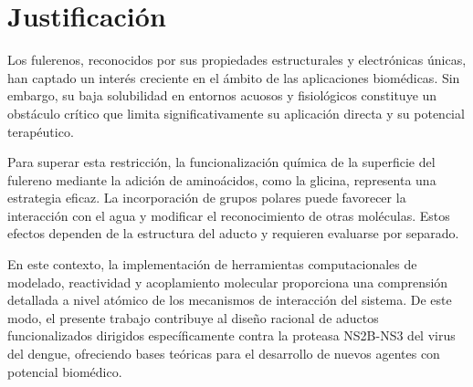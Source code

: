 \titleformat{\chapter}[display]
  {\normalfont\bfseries}{}{0pt}{\Large} %
\chapter{Justificación}
Los fulerenos, reconocidos por sus propiedades estructurales y electrónicas únicas, han captado un interés creciente en el ámbito de las aplicaciones biomédicas. Sin embargo, su baja solubilidad en entornos acuosos y fisiológicos constituye un obstáculo crítico que limita significativamente su aplicación directa y su potencial terapéutico.

Para superar esta restricción, la funcionalización química de la superficie del fulereno mediante la adición de aminoácidos, como la glicina, representa una estrategia eficaz. La incorporación de grupos polares puede favorecer la interacción con el agua y modificar el reconocimiento de otras moléculas. Estos efectos dependen de la estructura del aducto y requieren evaluarse por separado.

En este contexto, la implementación de herramientas computacionales de modelado, reactividad y acoplamiento molecular proporciona una comprensión detallada a nivel atómico de los mecanismos de interacción del sistema. De este modo, el presente trabajo contribuye al diseño racional de aductos funcionalizados dirigidos específicamente contra la proteasa NS2B-NS3 del virus del dengue, ofreciendo bases teóricas para el desarrollo de nuevos agentes con potencial biomédico.